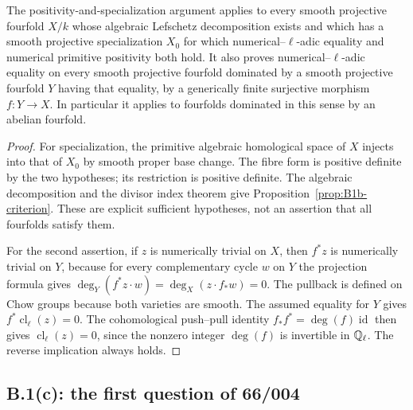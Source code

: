 \begin{proposition}\label{prop:B1b-scope}
The positivity-and-specialization argument applies to every smooth
projective fourfold $X/k$ whose algebraic Lefschetz decomposition exists
and which has a smooth projective specialization $X_0$ for which
numerical--$\ell$-adic equality and numerical primitive positivity both
hold. It also proves numerical--$\ell$-adic equality on every smooth
projective fourfold dominated by a smooth projective fourfold $Y$ having
that equality, by a generically finite surjective morphism
$f:Y\to X$. In particular it applies to fourfolds dominated in this
sense by an abelian fourfold.
\end{proposition}
\begin{proof}
For specialization, the primitive algebraic homological space of $X$
injects into that of $X_0$ by smooth proper base change. The fibre form is
positive definite by the two hypotheses; its restriction is positive
definite. The algebraic decomposition and the divisor index theorem give
Proposition~\ref{prop:B1b-criterion}. These are explicit sufficient
hypotheses, not an assertion that all fourfolds satisfy them.

For the second assertion, if $z$ is numerically trivial on $X$, then
$f^*z$ is numerically trivial on $Y$, because for every complementary
cycle $w$ on $Y$ the projection formula gives
$\deg_Y(f^*z\cdot w)=\deg_X(z\cdot f_*w)=0$.
The pullback is defined on Chow groups because both varieties are smooth.
The assumed equality for $Y$ gives $f^*\operatorname{cl}_\ell(z)=0$.
The cohomological push--pull identity
$f_*f^*=\deg(f)\operatorname{id}$ then gives
$\operatorname{cl}_\ell(z)=0$, since the nonzero integer $\deg(f)$ is
invertible in ${\mathbb{Q}}_\ell$. The reverse implication always holds.
\end{proof}



\subsection{B.1(c): the first question of 66/004}

